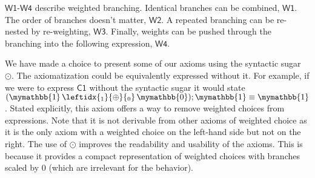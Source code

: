 \documentclass[a4paper,UKenglish,cleveref, autoref, thm-restate]{lipics-v2021}
\newcommand{\WC}[2]{\,\leftidx{_{#1}}{{\oplus}}{_{#2}}\,}
\newcommand{\Ax}[1]{\ensuremath{\mathsf{#1}}}
\newcommand{\bskip}{\mymathbb{1}}
\newcommand{\babort}{\mymathbb{0}}
\theoremstyle{plain}\newtheoremrep{thm}{Theorem}[section]
\begin{document}
	\Ax{W1}-\Ax{W4} describe weighted branching. Identical branches can be combined, \Ax{W1}. The order of branches doesn't matter, \Ax{W2}. A repeated branching can be re-nested by re-weighting, \Ax{W3}. Finally, weights can be pushed through the branching into the following expression, \Ax{W4}.
	
	\begin{rem}
		We have made a choice to present some of our axioms using the syntactic sugar $\odot$. The axiomatization could be equivalently expressed without it. For example, if we were to express \Ax{C1} without the syntactic sugar it would state $(\bskip \WC{1}{0} \babort);\bskip \equiv \bskip$. Stated explicitly, this axiom offers a way to remove weighted choices from expressions. Note that it is not derivable from other axioms of weighted choice as it is the only axiom with a weighted choice on the left-hand side but not on the right. The use of $\odot$ improves the readability and usability of the axioms. This is because it provides a compact representation of weighted choices with branches scaled by $0$ (which are irrelevant for the behavior).
	\end{rem}
	
\end{document}
